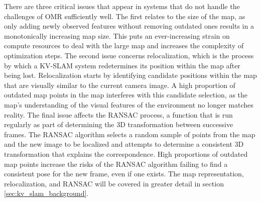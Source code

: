There are three critical issues that appear in systems that do not handle the challenges of OMR sufficiently well. The first relates to the size of the map, as only adding newly observed features without removing outdated ones results in a monotonically increasing map size. This puts an ever-increasing strain on compute resources to deal with the large map and increases the complexity of optimization steps. The second issue concerns relocalization, which is the process by which a KV-SLAM system redetermines its position within the map after being lost. Relocalization starts by identifying candidate positions within the map that are visually similar to the current camera image. A high proportion of outdated map points in the map interferes with this candidate selection, as the map's understanding of the visual features of the environment no longer matches reality. The final issue affects the RANSAC process, a function that is run regularly as part of determining the 3D transformation between successive frames. The RANSAC algorithm selects a random sample of points from the map and the new image to be localized and attempts to determine a consistent 3D transformation that explains the correspondence. High proportions of outdated map points increase the risks of the RANSAC algorithm failing to find a consistent pose for the new frame, even if one exists. The map representation, relocalization, and RANSAC will be covered in greater detail in section \ref{sec:kv_slam_background}.

